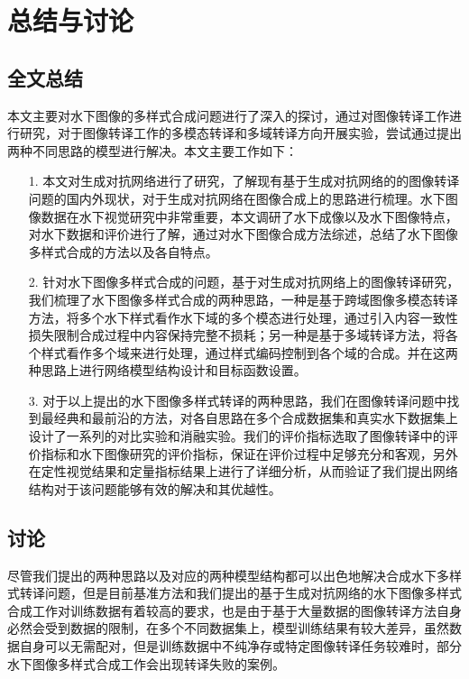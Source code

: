 \chapter{总结与讨论}
\section{全文总结}
本文主要对水下图像的多样式合成问题进行了深入的探讨，通过对图像转译工作进行研究，对于图像转译工作的多模态转译和多域转译方向开展实验，尝试通过提出两种不同思路的模型进行解决。本文主要工作如下：

\begin{itemize}
	\item [1.]
	本文对生成对抗网络进行了研究，了解现有基于生成对抗网络的的图像转译问题的国内外现状，对于生成对抗网络在图像合成上的思路进行梳理。水下图像数据在水下视觉研究中非常重要，本文调研了水下成像以及水下图像特点，对水下数据和评价进行了解，通过对水下图像合成方法综述，总结了水下图像多样式合成的方法以及各自特点。
	
	\item [2.]
	针对水下图像多样式合成的问题，基于对生成对抗网络上的图像转译研究，我们梳理了水下图像多样式合成的两种思路，一种是基于跨域图像多模态转译方法，将多个水下样式看作水下域的多个模态进行处理，通过引入内容一致性损失限制合成过程中内容保持完整不损耗；另一种是基于多域转译方法，将各个样式看作多个域来进行处理，通过样式编码控制到各个域的合成。并在这两种思路上进行网络模型结构设计和目标函数设置。

	\item [3.]
	对于以上提出的水下图像多样式转译的两种思路，我们在图像转译问题中找到最经典和最前沿的方法，对各自思路在多个合成数据集和真实水下数据集上设计了一系列的对比实验和消融实验。我们的评价指标选取了图像转译中的评价指标和水下图像研究的评价指标，保证在评价过程中足够充分和客观，另外在定性视觉结果和定量指标结果上进行了详细分析，从而验证了我们提出网络结构对于该问题能够有效的解决和其优越性。

\end{itemize}

\section{讨论}
尽管我们提出的两种思路以及对应的两种模型结构都可以出色地解决合成水下多样式转译问题，但是目前基准方法和我们提出的基于生成对抗网络的水下图像多样式合成工作对训练数据有着较高的要求，也是由于基于大量数据的图像转译方法自身必然会受到数据的限制，在多个不同数据集上，模型训练结果有较大差异，虽然数据自身可以无需配对，但是训练数据中不纯净存或特定图像转译任务较难时，部分水下图像多样式合成工作会出现转译失败的案例。


